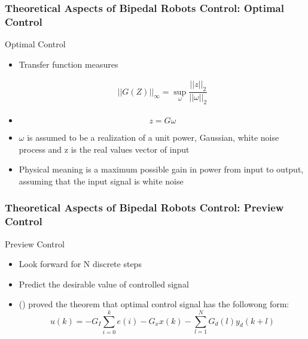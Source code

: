 \documentclass{beamer}
\begin{document}
	\begin{frame}
		\frametitle{Theoretical Aspects of Bipedal Robots Control: Optimal Control}
		\begin{block}{Optimal Control}
			\begin{itemize}
				\item
					Transfer function measures
					
					\begin{equation}
						\begin{split}
							||G(Z)||_\infty = \sup_{\omega} \dfrac{||z||_2}{||\omega||_2}
						\end{split}
					\end{equation}
				\item
					\begin{equation}
					z  =G \omega
					\end{equation}
				\item
					$\omega$ is assumed to be a realization of a unit power, Gaussian, white noise
					process and z is the real values vector of input
				\item
					Physical meaning is a maximum possible gain in power from input to output, assuming that the input signal is white noise
			\end{itemize}
		\end{block}
	\end{frame}


	\begin{frame}
		\frametitle{Theoretical Aspects of Bipedal Robots Control: Preview Control}
		\begin{block}{Preview Control}
			\begin{itemize}
				\item
					 Look forward for N discrete steps
				\item
					Predict the desirable value of controlled signal
				\item
					(\cite{katayama1985design}) proved the theorem that optimal control signal has the followong form:
					\begin{equation}
						u(k) = -G_I \sum^{k}_{i=0} e(i) - G_xx(k) - \sum^{N}_{l=1}G_d(l)y_d(k+l)
					\end{equation}
			\end{itemize}
		\end{block}
	\end{frame}
	
\end{document}

